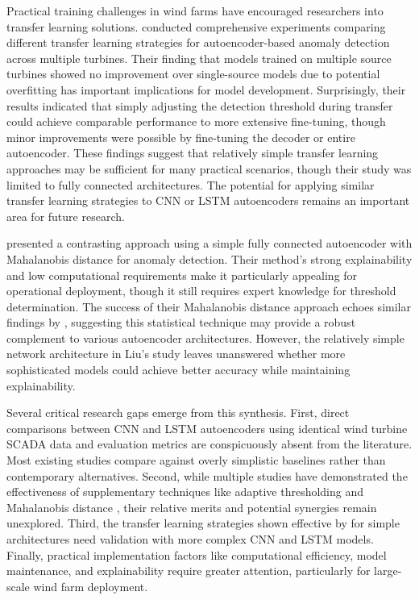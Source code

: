 \documentclass[a4paper,12pt]{article}
\begin{document}
Practical training challenges in wind farms have encouraged researchers into transfer learning solutions. \citeauthor{roelofs_transfer_2024} conducted comprehensive experiments comparing different transfer learning strategies for autoencoder-based anomaly detection across multiple turbines. Their finding that models trained on multiple source turbines showed no improvement over single-source models due to potential overfitting has important implications for model development. Surprisingly, their results indicated that simply adjusting the detection threshold during transfer could achieve comparable performance to more extensive fine-tuning, though minor improvements were possible by fine-tuning the decoder or entire autoencoder. These findings suggest that relatively simple transfer learning approaches may be sufficient for many practical scenarios, though their study was limited to fully connected architectures. The potential for applying similar transfer learning strategies to CNN or LSTM autoencoders remains an important area for future research.

\citeauthor{liu_wind_2022} presented a contrasting approach using a simple fully connected autoencoder with Mahalanobis distance for anomaly detection. Their method's strong explainability and low computational requirements make it particularly appealing for operational deployment, though it still requires expert knowledge for threshold determination. The success of their Mahalanobis distance approach echoes similar findings by \citeauthor{ahmad_autoencoder-based_2020}, suggesting this statistical technique may provide a robust complement to various autoencoder architectures. However, the relatively simple network architecture in Liu's study leaves unanswered whether more sophisticated models could achieve better accuracy while maintaining explainability.

Several critical research gaps emerge from this synthesis. First, direct comparisons between CNN and LSTM autoencoders using identical wind turbine SCADA data and evaluation metrics are conspicuously absent from the literature. Most existing studies compare against overly simplistic baselines rather than contemporary alternatives. Second, while multiple studies have demonstrated the effectiveness of supplementary techniques like adaptive thresholding \cite{zhao_anomaly_2018} and Mahalanobis distance \cite{ahmad_autoencoder-based_2020}, their relative merits and potential synergies remain unexplored. Third, the transfer learning strategies shown effective by \citeauthor{roelofs_transfer_2024} for simple architectures need validation with more complex CNN and LSTM models. Finally, practical implementation factors like computational efficiency, model maintenance, and explainability require greater attention, particularly for large-scale wind farm deployment.
\end{document}
